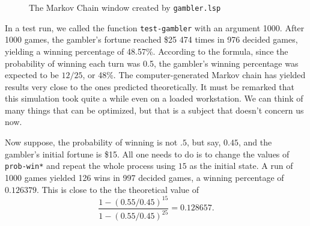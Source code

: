 \begin{figure}[tbhp]
  \caption{The Markov Chain window created by {\tt gambler.lsp}}
  \label{fig:gambler}


\end{figure}
In a test run, we called the function {\tt test-gambler} with an
argument 1000. After 1000 games, the gambler's fortune reached \$25
474 times in 976 decided games, yielding a winning percentage of
48.57\%.  According to the formula, since the probability of winning
each turn was 0.5, the gambler's winning percentage was expected to be
$12/25$, or 48\%.  The computer-generated Markov chain has yielded
results very close to the ones predicted theoretically.
It must be remarked that this simulation took quite a while even on a 
loaded workstation.  We can think of many things that can be
optimized, but that is a subject that doesn't concern us now. 

Now suppose, the probability of winning is not $.5$, but say, $0.45$,
and the gambler's initial fortune is \$15. 
All one needs to do is to change the values of {\tt *prob-win*} and 
repeat the whole process using $15$ as the initial state. A run of
1000 games yielded  126 wins in 997 
decided games, a winning percentage of $0.126379$.  This is close to
the the theoretical value of 
$$
\frac{1-(0.55/0.45)^{15}}{1-(0.55/0.45)^{25}}= 0.128657.
$$	











